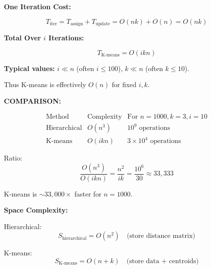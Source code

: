 \documentclass[12pt]{article}
\begin{document}
\begin{solution}
\textbf{One Iteration Cost:}

\[
T_{\text{iter}} = T_{\text{assign}} + T_{\text{update}} = O(nk) + O(n) = O(nk)
\]

\textbf{Total Over $i$ Iterations:}

\[
\boxed{T_{\text{K-means}} = O(ikn)}
\]

\textbf{Typical values:} $i \ll n$ (often $i \leq 100$), $k \ll n$ (often $k \leq 10$).

Thus K-means is effectively $O(n)$ for fixed $i, k$.

\textbf{COMPARISON:}

\[
\begin{array}{c|c|c}
\text{Method} & \text{Complexity} & \text{For } n=1000, k=3, i=10 \\
\hline
\text{Hierarchical} & O(n^3) & 10^9 \text{ operations} \\
\text{K-means} & O(ikn) & 3 \times 10^4 \text{ operations}
\end{array}
\]

Ratio:
\[
\frac{O(n^3)}{O(ikn)} = \frac{n^2}{ik} = \frac{10^6}{30} \approx 33{,}333
\]

K-means is $\sim 33{,}000\times$ faster for $n=1000$.

\textbf{Space Complexity:}

Hierarchical:
\[
S_{\text{hierarchical}} = O(n^2) \quad \text{(store distance matrix)}
\]

K-means:
\[
S_{\text{K-means}} = O(n + k) \quad \text{(store data + centroids)}
\]

\end{solution}
\end{document}
